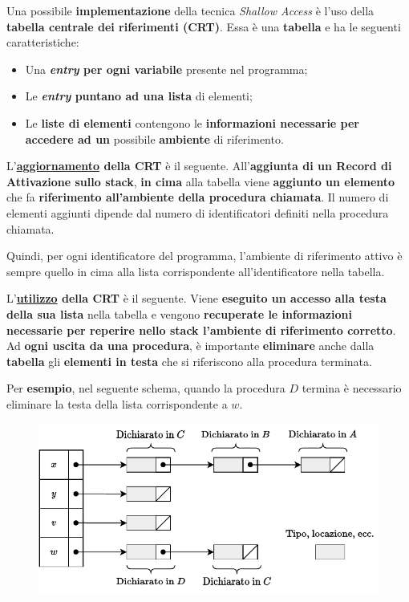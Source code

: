 \documentclass[a4paper]{article}
\begin{document}
	Una possibile \textbf{implementazione} della tecnica \emph{Shallow Access} è l'uso della \textcolor{Red3}{\textbf{tabella centrale dei riferimenti (CRT)}}. Essa è una \textbf{tabella} e ha le seguenti caratteristiche:
	\begin{itemize}
		\item Una \textbf{\emph{entry} per ogni variabile} presente nel programma;
		
		\item Le \textbf{\emph{entry} puntano ad una lista} di elementi;
		
		\item Le \textbf{liste di elementi} contengono le \textbf{informazioni necessarie per accedere ad un} possibile \textbf{ambiente} di riferimento.
	\end{itemize}
	L'\textbf{\underline{aggiornamento} della CRT} è il seguente. All'\textbf{aggiunta di un Record di Attivazione sullo stack}, \textbf{in cima} alla tabella viene \textbf{aggiunto un elemento} che fa \textbf{riferimento all'ambiente della procedura chiamata}. Il numero di elementi aggiunti dipende dal numero di identificatori definiti nella procedura chiamata.
		
	Quindi, per ogni identificatore del programma, l'ambiente di riferimento attivo è sempre quello in cima alla lista corrispondente all'identificatore nella tabella.\newline
	
	\noindent
	L'\textbf{\underline{utilizzo} della CRT} è il seguente. Viene \textbf{eseguito un accesso alla testa della sua lista} nella tabella e vengono \textbf{recuperate le informazioni necessarie per reperire nello stack l'ambiente di riferimento corretto}. Ad \textbf{ogni uscita da una procedura}, è importante \textbf{eliminare} anche dalla \textbf{tabella} gli \textbf{elementi in testa} che si riferiscono alla procedura terminata.\newline
	
	\noindent
	Per \textcolor{Green4}{\textbf{esempio}}, nel seguente schema, quando la procedura $D$ termina è necessario eliminare la testa della lista corrispondente a $w$.
	\begin{figure}[!htp]
		\centering
		\includegraphics[width=\textwidth]{img/CRT.pdf}
	\end{figure}\newpage
	
\end{document}
